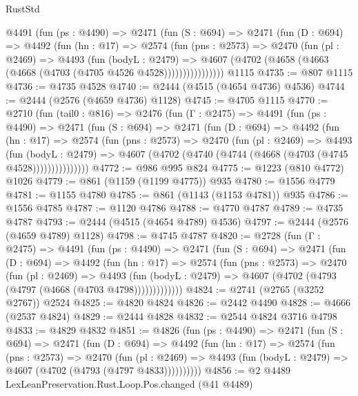 \begin{lexlean}{RustStd}
\begin{coremodule}
        @4491
          (fun (ps : @4490) =>
          @2471
            (fun (S : @694) =>
            @2471
              (fun (D : @694) =>
              @4492
                (fun (hn : @17) =>
                @2574
                  (fun (pns : @2573) =>
                  @2470
                    (fun (pl : @2469) =>
                    @4493
                      (fun (bodyL : @2479) =>
                      @4607 (@4702 (@4658 (@4663 (@4668 (@4703 (@4705 @4526 @4528))))))))))))))))
    @1115
@4735 := @807 @1115
@4736 := @4735 @4528
@4740 := @2444 (@4515 (@4654 @4736) @4536)
@4744 := @2444 (@2576 (@4659 @4736) @1128)
@4745 := @4705 @1115
@4770 := @2710
    (fun (tail0 : @816) =>
    @2476
      (fun (Γ : @2475) =>
      @4491
        (fun (ps : @4490) =>
        @2471
          (fun (S : @694) =>
          @2471
            (fun (D : @694) =>
            @4492
              (fun (hn : @17) =>
              @2574
                (fun (pns : @2573) =>
                @2470
                  (fun (pl : @2469) =>
                  @4493
                    (fun (bodyL : @2479) =>
                    @4607 (@4702 (@4740 (@4744 (@4668 (@4703 (@4745 @4528)))))))))))))))
@4772 := @986 @995 @824
@4775 := @1223 (@810 @4772) @1026
@4779 := @861 (@1159 (@1199 @4775)) @935
@4780 := @1556 @4779
@4781 := @1155 @4780
@4785 := @861 (@1143 (@1153 @4781)) @935
@4786 := @1556 @4785
@4787 := @1120 @4786
@4788 := @4770 @4787
@4789 := @4735 @4787
@4793 := @2444 (@4515 (@4654 @4789) @4536)
@4797 := @2444 (@2576 (@4659 @4789) @1128)
@4798 := @4745 @4787
@4820 := @2728
    (fun (Γ : @2475) =>
    @4491
      (fun (ps : @4490) =>
      @2471
        (fun (S : @694) =>
        @2471
          (fun (D : @694) =>
          @4492
            (fun (hn : @17) =>
            @2574
              (fun (pns : @2573) =>
              @2470
                (fun (pl : @2469) =>
                @4493
                  (fun (bodyL : @2479) =>
                  @4607 (@4702 (@4793 (@4797 (@4668 (@4703 @4798)))))))))))))
@4824 := @2741 (@2765 (@3252 @2767)) @2524
@4825 := @4820 @4824
@4826 := @2442 @4490
@4828 := @4666 (@2537 @4824)
@4829 := @2444 @4828
@4832 := @2544 @4824 @3716 @4798
@4833 := @4829 @4832
@4851 := @4826
    (fun (ps : @4490) =>
    @2471
      (fun (S : @694) =>
      @2471
        (fun (D : @694) =>
        @4492
          (fun (hn : @17) =>
          @2574
            (fun (pns : @2573) =>
            @2470
              (fun (pl : @2469) =>
              @4493 (fun (bodyL : @2479) => @4607 (@4702 (@4793 (@4797 @4833))))))))))
@4856 := @2 @4489 LexLeanPreservation.Rust.Loop.Pos.changed (@41 @4489)

\end{coremodule}
\end{lexlean}
